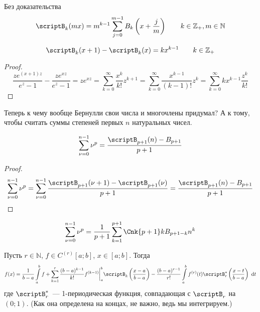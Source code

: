 \documentclass{article}
\begin{document}
    \begin{property}
        Без доказательства
        $$
        \scriptB_k(mx)=m^{k-1}\sum\limits_{j=0}^{m-1}B_k\left(x+\frac jm\right)\qquad k\in\mathbb Z_+,m\in\mathbb N
        $$
    \end{property}
    \begin{property}
        $$
        \scriptB_k(x+1)-\scriptB_k(x)=kx^{k-1}\qquad k\in\mathbb Z_+
        $$
    \end{property}
    \begin{proof}
        $$
        \frac{ze^{(x+1)z}}{e^z-1}-\frac{ze^{xz}}{e^z-1}=ze^{xz}=\sum\limits_{k=0}^\infty\frac{x^k}{k!}z^{k+1}=\sum\limits_{k=0}^\infty\frac{x^{k-1}}{(k-1)!}z^k=\sum\limits_{k=0}^\infty kx^{k-1}\frac{z^k}{k!}
        $$
    \end{proof}
    \begin{remark}
        Теперь к чему вообще Бернулли свои числа и многочлены придумал? А к тому, чтобы считать суммы степеней первых $n$ натуральных чисел.
    \end{remark}
    \begin{property}
        $$
        \sum\limits_{\nu=0}^{n-1}\nu^p=\frac{\scriptB_{p+1}(n)-B_{p+1}}{p+1}
        $$
    \end{property}
    \begin{proof}
        $$
        \sum\limits_{\nu=0}^{n-1}\nu^p=\sum\limits_{\nu=0}^{n-1}\frac{\scriptB_{p+1}(\nu+1)-\scriptB_{p+1}(\nu)}{p+1}=\frac{\scriptB_{p+1}(n)-B_{p+1}}{p+1}
        $$
    \end{proof}
    \begin{property}
        $$
        \sum\limits_{\nu=0}^{n-1}\nu^p=\frac1{p+1}\sum\limits_{k=1}^{p+1}\Cnk{p+1}kB_{p+1-k}n^k
        $$
    \end{property}
    \begin{theorem}
        \label{Разложение по многочленам Бернулли}
        Пусть $r\in\mathbb N$, $f\in C^{(r)}[a;b]$, $x\in[a;b]$. Тогда
        $$
        f(x)=\frac1{b-a}\int\limits_a^bf+\sum\limits_{k=1}^r\frac{(b-a)^{k-1}}{k!}f^{(k-1)}\bigg|_a^b\scriptB_k\left(\frac{x-a}{b-a}\right)-\frac{(b-a)^{r-1}}{r!}\int\limits_a^bf^{(r)}(t)\scriptB^*_r\left(\frac{x-t}{b-a}\right)~\mathrm dt
        $$
        где $\scriptB^*_r$~--- 1-периодическая функция, совпадающая с $\scriptB_r$ на $(0;1)$. (Как она определена на концах, не важно, ведь мы интегрируем.)
    \end{theorem}
\end{document}
